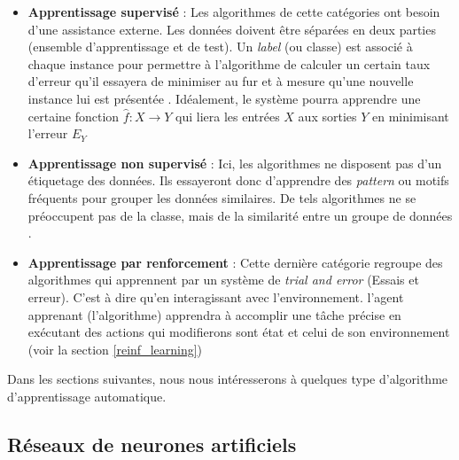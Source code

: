 		\begin{itemize}
			\item  \textbf{Apprentissage supervisé} : Les algorithmes de cette catégories ont besoin d'une assistance externe. Les données doivent être séparées en deux parties (ensemble d'apprentissage et de test). Un \textit{label} (ou classe) est associé à chaque instance pour permettre à l'algorithme de calculer un certain taux d'erreur qu'il essayera de minimiser au fur et à mesure qu'une nouvelle instance lui est présentée \cite{supervised_learning}. Idéalement, le système pourra apprendre une certaine fonction $\hat{f} : X \rightarrow Y$ qui liera les entrées $X$ aux sorties $Y$ en minimisant l'erreur $E_Y$ 
			
			\item \textbf{Apprentissage non supervisé} : Ici, les algorithmes ne disposent pas d'un étiquetage des données. Ils essayeront donc d'apprendre des \textit{pattern} ou motifs fréquents pour grouper les données similaires. De tels algorithmes ne se préoccupent pas de la classe, mais de la similarité entre un groupe de données \cite{unsupervised_learning}.
			
			\item \textbf{Apprentissage par renforcement} : Cette dernière catégorie regroupe des algorithmes qui apprennent par un système de \textit{trial and error} (Essais et erreur). C'est à dire qu'en interagissant avec l'environnement. l'agent apprenant (l'algorithme) apprendra à accomplir une tâche précise en exécutant des actions qui modifierons sont état et celui de son environnement (voir la section \ref{reinf_learning})
		\end{itemize}
	\par
	Dans les sections suivantes, nous nous intéresserons à quelques type d'algorithme d'apprentissage automatique. 
	\subsection{Réseaux de neurones artificiels}
